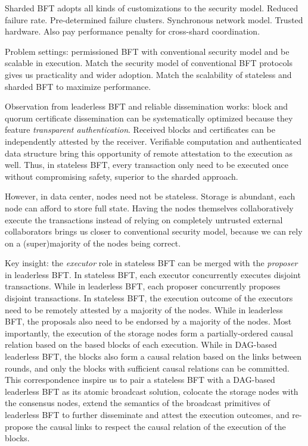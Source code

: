 Sharded BFT adopts all kinds of customizations to the security model.
Reduced failure rate.
Pre-determined failure clusters.
Synchronous network model.
Trusted hardware.
Also pay performance penalty for cross-shard coordination.

Problem settings: permissioned BFT with conventional security model and be scalable in execution.
Match the security model of conventional BFT protocols gives us practicality and wider adoption.
Match the scalability of stateless and sharded BFT to maximize performance.

Observation from leaderless BFT and reliable dissemination works: block and quorum certificate dissemination can be systematically optimized because they feature \emph{transparent authentication}.
Received blocks and certificates can be independently attested by the receiver.
Verifiable computation and authenticated data structure bring this opportunity of remote attestation to the execution as well.
Thus, in stateless BFT, every transaction only need to be executed once without compromising safety, superior to the sharded approach.

However, in data center, nodes need not be stateless.
Storage is abundant, each node can afford to store full state.
Having the nodes themselves collaboratively execute the transactions instead of relying on completely untrusted external collaborators brings us closer to conventional security model, because we can rely on a (super)majority of the nodes being correct.

Key insight: the \emph{executor} role in stateless BFT can be merged with the \emph{proposer} in leaderless BFT.
In stateless BFT, each executor concurrently executes disjoint transactions.
While in leaderless BFT, each proposer concurrently proposes disjoint transactions.
In stateless BFT, the execution outcome of the executors need to be remotely attested by a majority of the nodes.
While in leaderless BFT, the proposals also need to be endorsed by a majority of the nodes.
Most importantly, the execution of the storage nodes form a partially-ordered causal relation based on the based blocks of each execution.
While in DAG-based leaderless BFT, the blocks also form a causal relation based on the links between rounds, and only the blocks with sufficient causal relations can be committed.
This correspondence inspire us to pair a stateless BFT with a DAG-based leaderless BFT as its atomic broadcast solution, colocate the storage nodes with the consensus nodes, extend the semantics of the broadcast primitives of leaderless BFT to further disseminate and attest the execution outcomes, and re-propose the causal links to respect the causal relation of the execution of the blocks.

